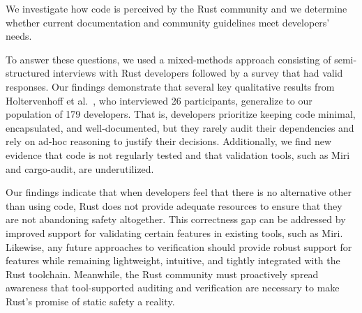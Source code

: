 \rsqfive We investigate how \unsafe code is perceived by the Rust community and we determine whether current documentation and community guidelines meet developers' needs.  

To answer these questions, we used a mixed-methods approach consisting of semi-structured interviews with  Rust developers followed by a survey that had  valid responses. Our findings demonstrate that several key qualitative results from Holtervenhoff et al.~\cite{holtervennhoff23}, who interviewed 26 participants, generalize to our population of 179 developers. That is, developers prioritize keeping \unsafe code minimal, encapsulated, and well-documented, but they rarely audit their dependencies and rely on ad-hoc reasoning to justify their decisions. Additionally, we find new evidence that \unsafe code is not regularly tested and that validation tools, such as Miri and cargo-audit\cite{cargoaudit}, are underutilized. 

Our findings indicate that when developers feel that there is no alternative other than using \unsafe code, Rust does not provide adequate resources to ensure that they are not abandoning safety altogether. This correctness gap can be addressed by improved support for validating certain \unsafe features in existing tools, such as Miri. Likewise, any future approaches to verification should provide robust support for \unsafe features while remaining lightweight, intuitive, and tightly integrated with the Rust toolchain. Meanwhile, the Rust community must proactively spread awareness that tool-supported auditing and verification are necessary to make Rust's promise of static safety a reality.